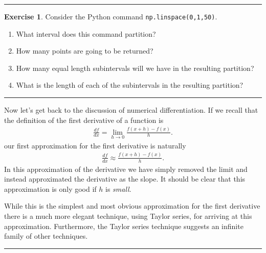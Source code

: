 \documentclass[
]{book}
\providecommand{\tightlist}{%
  \setlength{\itemsep}{0pt}\setlength{\parskip}{0pt}}
\theoremstyle{definition}
\theoremstyle{definition}
\theoremstyle{definition}
\newtheorem{exercise}{Exercise}[chapter]
\theoremstyle{remark}
\begin{document}
\begin{center}\rule{0.5\linewidth}{0.5pt}\end{center}

\begin{exercise}
\protect\hypertarget{exr:unnamed-chunk-142}{}{\label{exr:unnamed-chunk-142} }Consider the Python command \texttt{np.linspace(0,1,50)}.

\begin{enumerate}
\def\labelenumi{\alph{enumi}.}
\tightlist
\item
  What interval does this command partition?
\item
  How many points are going to be returned?
\item
  How many equal length subintervals will we have in the resulting partition?
\item
  What is the length of each of the subintervals in the resulting partition?
\end{enumerate}
\end{exercise}

\begin{center}\rule{0.5\linewidth}{0.5pt}\end{center}

Now let's get back to the discussion of numerical differentiation. If we recall that the definition of the first derivative of a function is
\[ \begin{aligned}
    \frac{df}{dx} = \lim_{h \to 0} \frac{f(x+h) - f(x)}{h}.
    \label{eqn:derivative_defintiion}\end{aligned}\]
our first approximation for the first derivative is naturally
\[ \begin{aligned}
    \frac{df}{dx} \approx \frac{f(x+h) - f(x)}{h}.
    \label{eqn:derivative_first_approx}\end{aligned}\]
In this approximation of the derivative we have simply removed the
limit and instead approximated the derivative as the slope. It should be
clear that this approximation is only good if \(h\) is \emph{small}.

While
this is the simplest and most obvious approximation for the first
derivative there is a much more elegant technique, using Taylor series,
for arriving at this approximation. Furthermore, the Taylor series
technique suggests an infinite family of other techniques.

\begin{center}\rule{0.5\linewidth}{0.5pt}\end{center}
\end{document}
